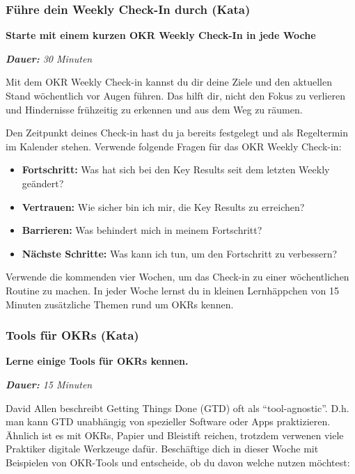 \documentclass[
  ngerman,
  paper=a4,
,captions=tableheading
]{scrartcl}
\providecommand{\tightlist}{%
  \setlength{\itemsep}{0pt}\setlength{\parskip}{0pt}}
\begin{document}
\hypertarget{fuxfchre-dein-weekly-check-in-durch-kata}{%
\subsubsection{Führe dein Weekly Check-In durch
(Kata)}\label{fuxfchre-dein-weekly-check-in-durch-kata}}

\textbf{Starte mit einem kurzen OKR Weekly Check-In in jede Woche}

\emph{\textbf{Dauer:} 30 Minuten}

Mit dem OKR Weekly Check-in kannst du dir deine Ziele und den aktuellen
Stand wöchentlich vor Augen führen. Das hilft dir, nicht den Fokus zu
verlieren und Hindernisse frühzeitig zu erkennen und aus dem Weg zu
räumen.

Den Zeitpunkt deines Check-in hast du ja bereits festgelegt und als
Regeltermin im Kalender stehen. Verwende folgende Fragen für das OKR
Weekly Check-in:

\begin{itemize}
\tightlist
\item
  \textbf{Fortschritt:} Was hat sich bei den Key Results seit dem
  letzten Weekly geändert?
\item
  \textbf{Vertrauen:} Wie sicher bin ich mir, die Key Results zu
  erreichen?
\item
  \textbf{Barrieren:} Was behindert mich in meinem Fortschritt?
\item
  \textbf{Nächste Schritte:} Was kann ich tun, um den Fortschritt zu
  verbessern?
\end{itemize}

Verwende die kommenden vier Wochen, um das Check-in zu einer
wöchentlichen Routine zu machen. In jeder Woche lernst du in kleinen
Lernhäppchen von 15 Minuten zusätzliche Themen rund um OKRs kennen.

\hypertarget{tools-fuxfcr-okrs-kata}{%
\subsubsection{Tools für OKRs (Kata)}\label{tools-fuxfcr-okrs-kata}}

\textbf{Lerne einige Tools für OKRs kennen.}

\emph{\textbf{Dauer:} 15 Minuten}

David Allen beschreibt Getting Things Done (GTD) oft als
``tool-agnostic''. D.h. man kann GTD unabhängig von spezieller Software
oder Apps praktizieren. Ähnlich ist es mit OKRs, Papier und Bleistift
reichen, trotzdem verwenen viele Praktiker digitale Werkzeuge dafür.
Beschäftige dich in dieser Woche mit Beispielen von OKR-Tools und
entscheide, ob du davon welche nutzen möchtest:
\end{document}
